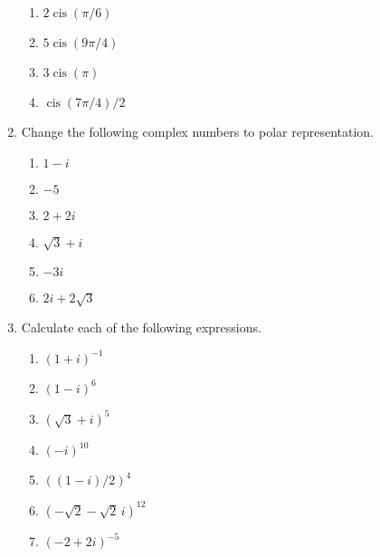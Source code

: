 \documentclass[12pt,reqno]{amsart}
\newcommand{\cis}{\ensuremath{\operatorname{cis}}}
\begin{document}
\begin{enumerate}[{\bf 1.}]
\begin{multicols}{2}
\begin{enumerate}
 \item
$2 \cis(\pi / 6 )$

 
 \item
$5 \cis(9\pi/4)$

\item
$3 \cis(\pi)$
 
 \item
$\cis(7\pi/4) /2$
 
\end{enumerate}
\end{multicols}


\item	  %
Change the following complex numbers to polar representation.
\begin{multicols}{3}
\begin{enumerate}
 
 \item
$1-i$

 \item
$-5$
 
 \item
$2+2i$
 
 
\item
$\sqrt{3} + i$

 \item
$-3i$

 \item
$2i + 2 \sqrt{3}$
 
\end{enumerate}
\end{multicols}

 
 
\item %
Calculate each of the following expressions.
\begin{multicols}{2}
\begin{enumerate}
 
 \item
$(1+i)^{-1}$

 \item
$(1 - i)^{6}$
 
 \item
$(\sqrt{3}+i)^{5}$

 \item
$(-i)^{10}$
 
 \item
$((1-i)/2)^{4}$

 \item
$(-\sqrt{2} - \sqrt{2}\, i)^{12}$
 
 \item
$(-2+2i)^{-5}$
 

\end{enumerate}
\end{multicols}
\end{enumerate}
\end{document}
